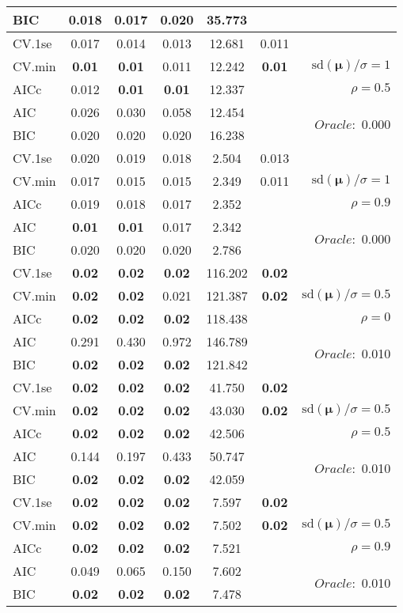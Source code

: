 \begin{table}
\begin{center}
\begin{tabular}{l*{5}{c}|r}
BIC & 0.018 & 0.017 & 0.020 & 35.773 & &  \\
 \hline 
CV.1se & 0.017 & 0.014 & 0.013 & 12.681 & 0.011 & \\
CV.min & {\bf 0.01} & {\bf 0.01} & 0.011 & 12.242 & {\bf 0.01} &  $\mathrm{sd}(\mathbf{\mu})/\sigma=1$ \\
AICc & 0.012 & {\bf 0.01} & {\bf 0.01} & 12.337 & & $\rho=0.5$ \\
AIC & 0.026 & 0.030 & 0.058 & 12.454 & &  \multirow{2}{*}{$Oracle: $ 0.000} \\
BIC & 0.020 & 0.020 & 0.020 & 16.238 & &  \\
 \hline 
CV.1se & 0.020 & 0.019 & 0.018 & 2.504 & 0.013 & \\
CV.min & 0.017 & 0.015 & 0.015 & 2.349 & 0.011 &  $\mathrm{sd}(\mathbf{\mu})/\sigma=1$ \\
AICc & 0.019 & 0.018 & 0.017 & 2.352 & & $\rho=0.9$ \\
AIC & {\bf 0.01} & {\bf 0.01} & 0.017 & 2.342 & &  \multirow{2}{*}{$Oracle: $ 0.000} \\
BIC & 0.020 & 0.020 & 0.020 & 2.786 & &  \\
 \hline 
CV.1se & {\bf 0.02} & {\bf 0.02} & {\bf 0.02} & 116.202 & {\bf 0.02} & \\
CV.min & {\bf 0.02} & {\bf 0.02} & 0.021 & 121.387 & {\bf 0.02} &  $\mathrm{sd}(\mathbf{\mu})/\sigma=0.5$ \\
AICc & {\bf 0.02} & {\bf 0.02} & {\bf 0.02} & 118.438 & & $\rho=0$ \\
AIC & 0.291 & 0.430 & 0.972 & 146.789 & &  \multirow{2}{*}{$Oracle: $ 0.010} \\
BIC & {\bf 0.02} & {\bf 0.02} & {\bf 0.02} & 121.842 & &  \\
 \hline 
CV.1se & {\bf 0.02} & {\bf 0.02} & {\bf 0.02} & 41.750 & {\bf 0.02} & \\
CV.min & {\bf 0.02} & {\bf 0.02} & {\bf 0.02} & 43.030 & {\bf 0.02} &  $\mathrm{sd}(\mathbf{\mu})/\sigma=0.5$ \\
AICc & {\bf 0.02} & {\bf 0.02} & {\bf 0.02} & 42.506 & & $\rho=0.5$ \\
AIC & 0.144 & 0.197 & 0.433 & 50.747 & &  \multirow{2}{*}{$Oracle: $ 0.010} \\
BIC & {\bf 0.02} & {\bf 0.02} & {\bf 0.02} & 42.059 & &  \\
 \hline 
CV.1se & {\bf 0.02} & {\bf 0.02} & {\bf 0.02} & 7.597 & {\bf 0.02} & \\
CV.min & {\bf 0.02} & {\bf 0.02} & {\bf 0.02} & 7.502 & {\bf 0.02} &  $\mathrm{sd}(\mathbf{\mu})/\sigma=0.5$ \\
AICc & {\bf 0.02} & {\bf 0.02} & {\bf 0.02} & 7.521 & & $\rho=0.9$ \\
AIC & 0.049 & 0.065 & 0.150 & 7.602 & &  \multirow{2}{*}{$Oracle: $ 0.010} \\
BIC & {\bf 0.02} & {\bf 0.02} & {\bf 0.02} & 7.478 & &  \\
 \hline 
\end{tabular}
\end{center}
\vspace{-1cm}
\end{table}




